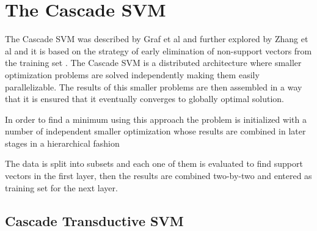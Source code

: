 \section{The Cascade SVM}
The Cascade SVM was described by Graf et al \cite{GrafCBDV04} and
further explored by Zhang et al \cite{ZhangZY05} and it is based on
the strategy of early elimination of non-support vectors from the
training set \cite{Joachims/99a}. The Cascade SVM is a distributed
architecture where smaller optimization problems are solved independently
making them easily parallelizable. The results of this smaller problems
are then assembled in a way that it is ensured that it eventually converges
to globally optimal solution.

In order to find a minimum using this approach the problem is initialized
with a number of independent smaller optimization whose results are
combined in later stages in a hierarchical fashion %

The data is split into subsets and each one of them is evaluated to find support vectors in the first layer,
then the results are combined two-by-two and entered as training set
for the next layer. 

\subsection{Cascade Transductive SVM}

